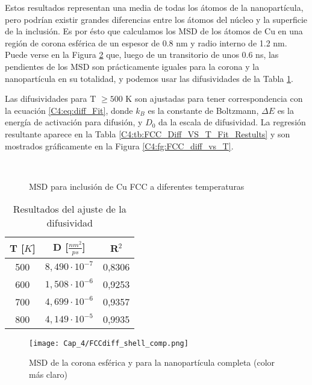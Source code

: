 Estos resultados representan una media de todas los átomos de la nanopartícula, pero podrían existir grandes diferencias entre los átomos del núcleo y la superficie de la inclusión. Es por ésto que calculamos los MSD de los átomos de Cu en una región de corona esférica de un espesor de 0.8 nm y radio interno de 1.2 nm. Puede verse en la Figura \ref{C4:fg:FCCdiff_shell_comp} que, luego de un transitorio de unos 0.6 ns, las pendientes de los MSD son prácticamente iguales para la corona y la nanopartícula en su totalidad, y podemos usar las difusividades de la Tabla \ref{C4:tb:FCC_Diff_Fit_Restults}.

Las difusividades para T $ \geq 500$ K son ajustadas para tener correspondencia con la ecuación \ref{C4:eq:diff_Fit}, donde $k_{B}$ es la constante de Boltzmann, $\Delta E$ es la energía de activación para difusión, y $D_{0}$ da la escala de difusividad. La regresión resultante aparece en la Tabla \ref{C4:tb:FCC_Diff_VS_T_Fit_Restults} y son mostrados gráficamente en la Figura \ref{C4:fg:FCC_diff_vs_T}.

\begin{figure}[htp]
\centering
{}
\\
\caption[MSD para inclusión de Cu FCC a diferentes temperaturas]{MSD para inclusión de Cu FCC a diferentes temperaturas}
\label{C4:fg:msd_Cu}
\end{figure}

\begin{table}[htp]
\caption{Resultados del ajuste de la difusividad}
\begin{center}
\begin{tabular}{*{3}{c}}
\hline
T [$K$] & D [$\frac{nm^{2}}{ps}$] & R$^{2}$ \\
\hline \hline
500 & $8,490\cdot 10^{-7}$ & 0,8306 \\
\hline
600 & $1,508\cdot 10^{-6}$ & 0,9253 \\
\hline
700 & $4,699\cdot 10^{-6}$ & 0,9357 \\
\hline
800 & $4,149\cdot 10^{-5}$ & 0,9935 \\
\hline
\end{tabular}
\end{center}
\label{C4:tb:FCC_Diff_Fit_Restults}
\end{table}

\begin{figure}[htp]
\centering
\texttt{[image: Cap\_4/FCCdiff\_shell\_comp.png]}
\caption[MSD de la corona esférica y la nanopartícula completa]{MSD de la corona esférica y para la nanopartícula completa (color más claro)}
\label{C4:fg:FCCdiff_shell_comp}
\end{figure}

